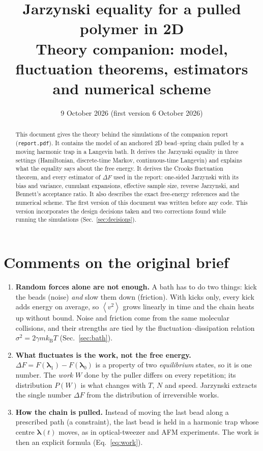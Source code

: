 \documentclass[11pt,a4paper]{article}
\title{Jarzynski equality for a pulled polymer in 2D\\[0.3em]
\large Theory companion: model, fluctuation theorems, estimators and numerical scheme}
\author{}
\date{9 October 2026 (first version 6 October 2026)}
\newcommand{\kT}{k_{\mathrm B}T}
\newcommand{\avg}[1]{\left\langle #1\right\rangle}
\newcommand{\lam}{\bm{\lambda}}
\begin{document}
\maketitle

\begin{abstract}
This document gives the theory behind the simulations of the companion report
(\texttt{report.pdf}). It contains the model of an anchored 2D bead--spring chain pulled by a
moving harmonic trap in a Langevin bath. It derives the Jarzynski equality in three settings
(Hamiltonian, discrete-time Markov, continuous-time Langevin) and explains what the equality says
about the free energy. It derives the Crooks fluctuation theorem, and every estimator of $\Delta F$
used in the report: one-sided Jarzynski with its bias and variance, cumulant expansions, effective
sample size, reverse Jarzynski, and Bennett's acceptance ratio. It also describes the exact
free-energy references and the numerical scheme. The first version of this document was
written before any code. This version incorporates the design decisions taken and two corrections
found while running the simulations (Sec.~\ref{sec:decisions}).
\end{abstract}

\tableofcontents
\newpage

\section{Comments on the original brief}
\label{sec:corrections}

\begin{note}
\begin{enumerate}[leftmargin=*]
\item \textbf{Random forces alone are not enough.} A bath has to do two things: kick the beads
(noise) \emph{and} slow them down (friction). With kicks only, every kick adds energy on
average, so $\avg{v^2}$ grows linearly in time and the chain heats up without bound.
Noise and friction come from the same molecular collisions, and their strengths are tied by
the fluctuation--dissipation relation $\sigma^2 = 2\gamma m\kT$ (Sec.~\ref{sec:bath}).
\item \textbf{What fluctuates is the work, not the free energy.} $\Delta F=F(\lam_1)-F(\lam_0)$
is a property of two \emph{equilibrium} states, so it is one number. The \emph{work} $W$ done by
the puller differs on every repetition; its distribution $P(W)$ is what changes with $T$, $N$
and speed. Jarzynski extracts the single number $\Delta F$ from the distribution of irreversible works.
\item \textbf{How the chain is pulled.} Instead of moving the last bead along a prescribed path
(a constraint), the last bead is held in a harmonic trap whose centre $\lam(t)$ moves, as in
optical-tweezer and AFM experiments. The work is then an explicit formula (Eq.~\ref{eq:work}).
\end{enumerate}
\end{note}
\end{document}
